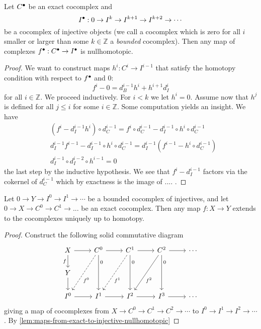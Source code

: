 \begin{lem}\label{lem:maps-from-exact-to-injective-nullhomotopic}
	Let ${C}^\bullet$ be an exact cocomplex and \[
    	{I}^\bullet: 0 \to I^k \to I^{k+1} \to I^{k+2} \to \cdots 
    \] be a cocomplex of injective objects (we call a cocomplex which is zero for all $i$ smaller or larger than some $k \in \mathbb{Z}$ a \emph{bounded} cocomplex). 
	Then any map of complexes ${f}^\bullet: {C}^\bullet \to {I}^\bullet$ is nullhomotopic. 
\end{lem}
\begin{proof}
	We want to construct maps $h^i: C^i \to I^{i-1}$ that satisfy the homotopy condition with respect to ${f}^\bullet$ and $0$: \[
    	f^i - 0 = d_B^{i-1}h^i + h^{i+1}d_I^i
    \] for all $i \in \mathbb{Z}$. We proceed inductively. For $i < k$ we let $h^i = 0$. Assume now that $h^j$ is defined for all $j \leq i$ for some $i \in \mathbb{Z}$. 
	Some computation yields an insight. We have 
	\begin{align*}
    	&(f^i - d_I^{i-1}h^i) \circ d_C^{i-1} = f^i \circ d_C^{i-1} - d_I ^{i-1} \circ h^i \circ d_C^{i-1}\\
		& d_I^{i-1}f^{i-1} - d_I^{i-1}\circ h^i \circ d_C^{i-1} = d_I^{i-1}(f^{i-1} - h^i \circ d_C^{i-1})\\
		& d^{i-1}_I \circ d_I^{i-2} \circ h^{i-1} = 0
    \end{align*} the last step by the inductive hypothesis. 
	We see that $f^i - d_I^{i-1}$ factors via the cokernel of $d_C^{i-1}$ which by exactness is the image of .... . 
\end{proof}

\begin{cor}\label{cor:extend-map-exact-complex-to-complex-of-injectives}
	Let $0 \to Y \to I^0 \to I^1 \to \cdots$ be a bounded cocomplex of injectives, and let $0 \to X \to C^0 \to C^1 \to ...$ be an exact cocomplex. Then any map $f: X \to Y$ extends to the cocomplexes uniquely up to homotopy. 
\end{cor}
\begin{proof}
Construct the following solid commutative diagram 	
\[\begin{tikzcd}
	X & {C^0} & {C^1} & {C^2} & \cdots \\
	Y \\
	{I^0} & {I^1} & {I^2} & {I^3} & \cdots
	\arrow[from=1-1, to=1-2]
	\arrow["f"', from=1-1, to=2-1]
	\arrow[from=1-2, to=1-3]
	\arrow["{f^0}"{pos=0.6}, dashed, from=1-2, to=3-1]
	\arrow["0"{pos=0.2}, from=1-2, to=3-2]
	\arrow[from=1-3, to=1-4]
	\arrow["{f^1}"{pos=0.6}, dashed, from=1-3, to=3-2]
	\arrow["0"{pos=0.2}, from=1-3, to=3-3]
	\arrow[from=1-4, to=1-5]
	\arrow["{f^2}"{pos=0.6}, from=1-4, to=3-3]
	\arrow["0"{pos=0.2}, from=1-4, to=3-4]
	\arrow[from=2-1, to=3-1]
	\arrow[from=3-1, to=3-2]
	\arrow[from=3-2, to=3-3]
	\arrow[from=3-3, to=3-4]
	\arrow[from=3-4, to=3-5]
\end{tikzcd}\]
giving a map of cocomplexes from $X \to C^0 \to C^1 \to C^2 \to \cdots$ to $I^0 \to I^1 \to I^2 \to \cdots$. 
By \cref{lem:maps-from-exact-to-injective-nullhomotopic} 
\end{proof}

